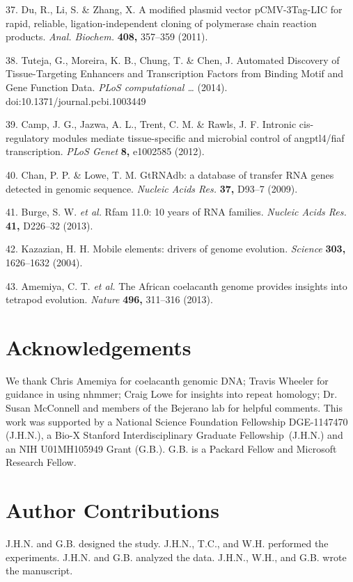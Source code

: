 \documentclass[]{article}
\begin{document}
37. Du, R., Li, S. \& Zhang, X. A modified plasmid vector pCMV-3Tag-LIC
for rapid, reliable, ligation-independent cloning of polymerase chain
reaction products. \emph{Anal. Biochem.} \textbf{408,} 357--359 (2011).

38. Tuteja, G., Moreira, K. B., Chung, T. \& Chen, J. Automated
Discovery of Tissue-Targeting Enhancers and Transcription Factors from
Binding Motif and Gene Function Data. \emph{PLoS computational \ldots{}}
(2014). doi:10.1371/journal.pcbi.1003449

39. Camp, J. G., Jazwa, A. L., Trent, C. M. \& Rawls, J. F. Intronic
cis-regulatory modules mediate tissue-specific and microbial control of
angptl4/fiaf transcription. \emph{PLoS Genet} \textbf{8,} e1002585
(2012).

40. Chan, P. P. \& Lowe, T. M. GtRNAdb: a database of transfer RNA genes
detected in genomic sequence. \emph{Nucleic Acids Res.} \textbf{37,}
D93--7 (2009).

41. Burge, S. W. \emph{et al.} Rfam 11.0: 10 years of RNA families.
\emph{Nucleic Acids Res.} \textbf{41,} D226--32 (2013).

42. Kazazian, H. H. Mobile elements: drivers of genome evolution.
\emph{Science} \textbf{303,} 1626--1632 (2004).

43. Amemiya, C. T. \emph{et al.} The African coelacanth genome provides
insights into tetrapod evolution. \emph{Nature} \textbf{496,} 311--316
(2013).

\section{Acknowledgements}\label{acknowledgements}

We thank Chris Amemiya for coelacanth genomic DNA; Travis Wheeler for
guidance in using nhmmer; Craig Lowe for insights into repeat homology;
Dr. Susan McConnell and members of the Bejerano lab for helpful
comments. This work was supported by a National Science Foundation
Fellowship DGE-1147470 (J.H.N.), a Bio-X Stanford Interdisciplinary
Graduate Fellowship~(J.H.N.) and an NIH U01MH105949 Grant (G.B.). G.B.
is a Packard Fellow and Microsoft Research Fellow.

\section{Author Contributions}\label{author-contributions}

J.H.N. and G.B. designed the study. J.H.N., T.C., and W.H. performed the
experiments. J.H.N. and G.B. analyzed the data. J.H.N., W.H., and G.B.
wrote the manuscript.
\end{document}
